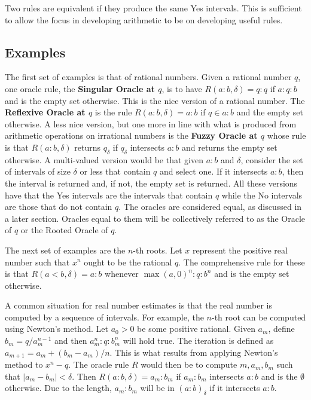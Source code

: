 \documentclass[12pt]{article}
\begin{document}
Two rules are equivalent if they produce the same Yes intervals. This is sufficient to allow the focus in developing arithmetic to be on developing useful rules. 

\subsection{Examples}

The first set of examples is that of rational numbers. Given a rational number $q$, one oracle rule, the \textbf{Singular Oracle at $q$}, is to have  $R(a:b, \delta) = q:q$ if $a:q:b$ and is the empty set otherwise. This is the nice version of a rational number. The \textbf{Reflexive Oracle at $q$} is the rule $R(a:b, \delta) = a:b$ if $q \in a:b$ and the empty set otherwise. A less nice version, but one more in line with what is produced from arithmetic operations on irrational numbers is the \textbf{Fuzzy Oracle at $q$} whose rule is that $R(a:b, \delta)$ returns $q_\delta$ if $q_\delta$ intersects $a:b$ and returns the empty set otherwise. A multi-valued version would be that given $a:b$ and $\delta$, consider the set of intervals of size $\delta$ or less that contain $q$ and select one. If it intersects $a:b$, then the interval is returned and, if not, the empty set is returned. All these versions have that the Yes intervals are the intervals that contain $q$ while the No intervals are those that do not contain $q$. The oracles are considered equal, as discussed in a later section. Oracles equal to them will be collectively referred to as the Oracle of $q$ or the Rooted Oracle of $q$.  

The next set of examples are the $n$-th roots. Let $x$ represent the positive real number such that $x^n$ ought to be the rational $q$. The comprehensive rule for these is that $R(a\lt b, \delta) = a:b$ whenever $\max(a, 0)^n:q:b^n$ and is the empty set otherwise.

A common situation for real number estimates is that the real number is computed by a sequence of intervals. For example, the $n$-th root can be computed using Newton's method. Let $a_0 >0$ be some positive rational. Given $a_m$, define $b_m = q/a_m^{n-1}$ and then $a_m^n : q : b_m^n$ will hold true. The iteration is defined as $a_{m+1} = a_m + (b_m - a_m)/n$. This is what results from applying Newton's method to $x^n - q$. The oracle rule $R$ would then be to compute $m, a_m, b_m$ such that $|a_m - b_m| < \delta$.  Then $R(a:b, \delta) = a_m:b_m$ if $a_m:b_m$ intersects $a:b$ and is the $\emptyset$ otherwise. Due to the length, $a_m:b_m$ will be in $(a:b)_\delta$ if it intersects $a:b$. 
\end{document}
